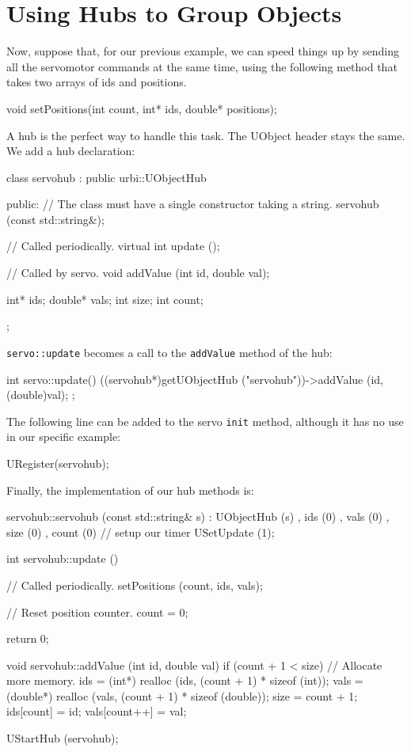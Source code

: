 \section{Using Hubs to Group Objects}

Now, suppose that, for our previous example, we can speed things up by
sending all the servomotor commands at the same time, using the
following method that takes two arrays of ids and positions.

\begin{cxx}
void setPositions(int count, int* ids, double* positions);
\end{cxx}

A hub is the perfect way to handle this task. The UObject header stays
the same. We add a hub declaration:

\begin{cxx}
class servohub : public urbi::UObjectHub
{
public:
  // The class must have a single constructor taking a string.
  servohub (const std::string&);

  // Called periodically.
  virtual int update ();

  // Called by servo.
  void addValue (int id, double val);

  int* ids;
  double* vals;
  int size;
  int count;
};
\end{cxx}

\lstinline{servo::update} becomes a call to the \lstinline{addValue}
method of the hub:

\begin{cxx}
int
servo::update()
{
  ((servohub*)getUObjectHub ("servohub"))->addValue (id, (double)val);
};
\end{cxx}

The following line can be added to the servo \lstinline{init} method,
although it has no use in our specific example:

\begin{cxx}
URegister(servohub);
\end{cxx}

Finally, the implementation of our hub methods is:

\begin{cxx}
servohub::servohub (const std::string& s)
  : UObjectHub (s)
  , ids   (0)
  , vals  (0)
  , size  (0)
  , count (0)
{
  // setup our timer
  USetUpdate (1);
}

int
servohub::update ()
{
  // Called periodically.
  setPositions (count, ids, vals);

  // Reset position counter.
  count = 0;

  return 0;
}

void
servohub::addValue (int id, double val)
{
  if (count + 1 < size)
  {
    // Allocate more memory.
    ids = (int*) realloc (ids, (count + 1) * sizeof (int));
    vals = (double*) realloc (vals, (count + 1) * sizeof (double));
    size = count + 1;
  }
  ids[count] = id;
  vals[count++] = val;
}

UStartHub (servohub);
\end{cxx}


